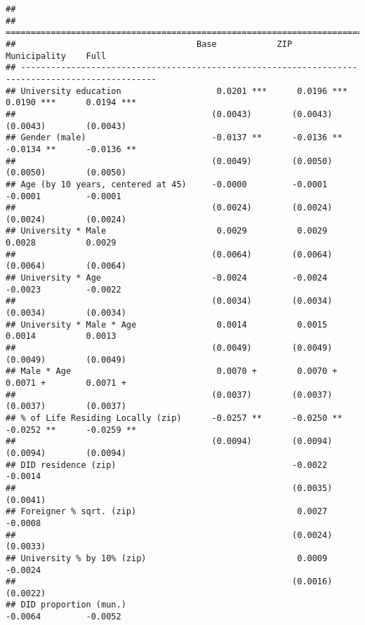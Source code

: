 \documentclass[
]{article}
\begin{document}
\begin{verbatim}
## 
## =================================================================================================
##                                    Base            ZIP             Municipality    Full          
## -------------------------------------------------------------------------------------------------
## University education                   0.0201 ***      0.0196 ***      0.0190 ***      0.0194 ***
##                                       (0.0043)        (0.0043)        (0.0043)        (0.0043)   
## Gender (male)                         -0.0137 **      -0.0136 **      -0.0134 **      -0.0136 ** 
##                                       (0.0049)        (0.0050)        (0.0050)        (0.0050)   
## Age (by 10 years, centered at 45)     -0.0000         -0.0001         -0.0001         -0.0001    
##                                       (0.0024)        (0.0024)        (0.0024)        (0.0024)   
## University * Male                      0.0029          0.0029          0.0028          0.0029    
##                                       (0.0064)        (0.0064)        (0.0064)        (0.0064)   
## University * Age                      -0.0024         -0.0024         -0.0023         -0.0022    
##                                       (0.0034)        (0.0034)        (0.0034)        (0.0034)   
## University * Male * Age                0.0014          0.0015          0.0014          0.0013    
##                                       (0.0049)        (0.0049)        (0.0049)        (0.0049)   
## Male * Age                             0.0070 +        0.0070 +        0.0071 +        0.0071 +  
##                                       (0.0037)        (0.0037)        (0.0037)        (0.0037)   
## % of Life Residing Locally (zip)      -0.0257 **      -0.0250 **      -0.0252 **      -0.0259 ** 
##                                       (0.0094)        (0.0094)        (0.0094)        (0.0094)   
## DID residence (zip)                                   -0.0022                         -0.0014    
##                                                       (0.0035)                        (0.0041)   
## Foreigner % sqrt. (zip)                                0.0027                         -0.0008    
##                                                       (0.0024)                        (0.0033)   
## University % by 10% (zip)                              0.0009                         -0.0024    
##                                                       (0.0016)                        (0.0022)   
## DID proportion (mun.)                                                 -0.0064         -0.0052    

\end{verbatim}
\end{document}
